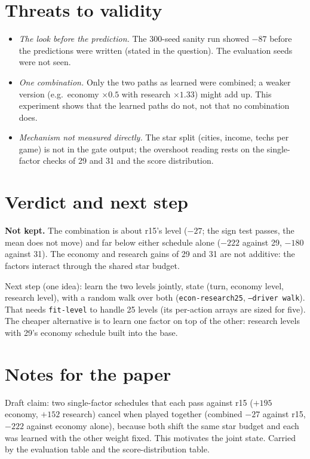 \documentclass{../polyexp}
\begin{document}
\section{Threats to validity}
\begin{itemize}
  \item \emph{The look before the prediction.} The 300-seed sanity run showed $-87$ before the predictions were
        written (stated in the question). The evaluation seeds were not seen.
  \item \emph{One combination.} Only the two paths as learned were combined; a weaker version (e.g.\ economy $\times0.5$
        with research $\times1.33$) might add up. This experiment shows that the learned paths do not, not that no
        combination does.
  \item \emph{Mechanism not measured directly.} The star split (cities, income, techs per game) is not in the gate
        output; the overshoot reading rests on the single-factor checks of 29 and 31 and the score distribution.
\end{itemize}

\section{Verdict and next step}
\textbf{Not kept.} The combination is about r15's level ($-27$; the sign test passes, the mean does not move) and
far below either schedule alone ($-222$ against 29, $-180$ against 31). The economy and research gains of 29 and 31
are not additive: the factors interact through the shared star budget.

Next step (one idea): learn the two levels jointly, state (turn, economy level, research level), with a random walk
over both (\texttt{econ-research25}, \texttt{--driver walk}). That needs \texttt{fit-level} to handle 25 levels (its
per-action arrays are sized for five). The cheaper alternative is to learn one factor on top of the other: research
levels with 29's economy schedule built into the base.

\section{Notes for the paper}
Draft claim: two single-factor schedules that each pass against r15 ($+195$ economy, $+152$ research) cancel when
played together (combined $-27$ against r15, $-222$ against economy alone), because both shift the same star budget
and each was learned with the other weight fixed. This motivates the joint state. Carried by the evaluation table
and the score-distribution table.
\end{document}
